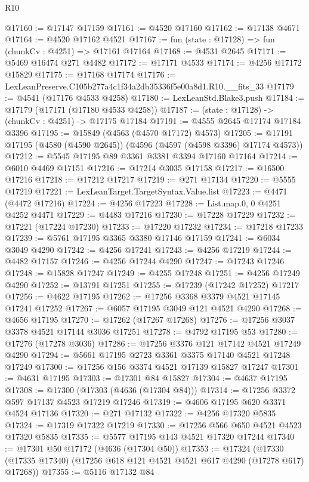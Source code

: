 \begin{lexlean}{R10}
\begin{coremodule}
@17160 := @17147 @17159
@17161 := @4520 @17160
@17162 := @17138 @4671
@17164 := @4520 @17162 @4521
@17167 := fun (state : @17128) => fun (chunkCv : @4251) => @17161 @17164
@17168 := @4531 @2645
@17171 := @5469 @16474 @271 @4482
@17172 := @17171 @4533
@17174 := @4256 @17172 @15829
@17175 := @17168 @17174
@17176 := LexLeanPreserve.C105b277a4c1f34a2db35336f5e00a8d1.R10.__fits_33
@17179 := @4541 (@17176 @4533 @4258)
@17180 := LexLeanStd.Blake3.push
@17184 := @17179 (@17171 (@17180 @4533 @4258))
@17187 := (state : @17128) -> (chunkCv : @4251) -> @17175 @17184
@17191 := @4555 @2645 @17174 @17184 @3396
@17195 := @15849 (@4563 (@4570 @17172) @4573)
@17205 := @17191 @17195 (@4580 (@4590 @2645)) (@4596 (@4597 (@4598 @3396) @17174 @4573))
@17212 := @5545 @17195 @89 @3361 @3381 @3394 @17160 @17164
@17214 := @6010 @4469 @17151
@17216 := @17214 @3035 @17158
@17217 := @16500 @17216
@17218 := @17212 @17217
@17219 := @271 @17134
@17220 := @5555 @17219
@17221 := LexLeanTarget.TargetSyntax.Value.list
@17223 := @4471 (@4472 @17216)
@17224 := @4256 @17223
@17228 := List.map.{0, 0} @4251 @4252 @4471
@17229 := @4483 @17216
@17230 := @17228 @17229
@17232 := @17221 (@17224 @17230)
@17233 := @17220 @17232
@17234 := @17218 @17233
@17239 := @5761 @17195 @3365 @3380 @17146 @17159
@17241 := @6034 @3049 @4290
@17242 := @4256 @17241
@17243 := @4256 @17219
@17244 := @4482 @17157
@17246 := @4256 @17244 @4290
@17247 := @17243 @17246
@17248 := @15828 @17247
@17249 := @4255 @17248
@17251 := @4256 @17249 @4290
@17252 := @13791 @17251
@17255 := @17239 (@17242 @17252) @17217
@17256 := @4622 @17195
@17262 := @17256 @3368 @3379 @4521 @17145 @17241 @17252
@17267 := @6057 @17195 @3049 @121 @4521 @4290
@17268 := @4656 @17195
@17270 := @17262 (@17267 @17268)
@17276 := @17256 @3037 @3378 @4521 @17144 @3036 @17251
@17278 := @4792 @17195 @53
@17280 := @17276 (@17278 @3036)
@17286 := @17256 @3376 @121 @17142 @4521 @17249 @4290
@17294 := @5661 @17195 @2723 @3361 @3375 @17140 @4521 @17248 @17249
@17300 := @17256 @156 @3374 @4521 @17139 @15827 @17247
@17301 := @4631 @17195
@17303 := @17301 @84 @15827
@17304 := @4637 @17195
@17308 := @17300 (@17303 (@4636 (@17304 @84)))
@17314 := @17256 @3372 @597 @17137 @4523 @17219 @17246
@17319 := @4606 @17195 @620 @3371 @4524 @17136
@17320 := @271 @17132
@17322 := @4256 @17320 @5835
@17324 := @17319 @17322 @17219
@17330 := @17256 @566 @650 @4521 @4523 @17320 @5835
@17335 := @5577 @17195 @143 @4521 @17320 @17244
@17340 := @17301 @50 @17172 (@4636 (@17304 @50))
@17353 := @17324
    (@17330 (@17335 @17340) (@17256 @618 @121 @4521 @4521 @617 @4290 (@17278 @617) @17268))
@17355 := @5116 @17132 @84

\end{coremodule}
\end{lexlean}
